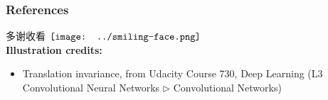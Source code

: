 \documentclass[16pt]{beamer}
\newcommand{\cc}[2]{#1}
\newcommand{\cc}[2]{#2}
\newcommand{\emp}[1]{\textbf{\color{violet}#1}}
\newcommand{\smiley}{$\vcenter{\hbox{\texttt{[image: ../smiling-face.png]}}}$}
\newif\ifframeinlbf
\begin{document}

\frameinlbffalse
\begin{frame}
\frametitle{References}
\cc{多谢收看}{Thanks for watching} \smiley \\
\textbf{Illustration credits:}
\begin{itemize}
	\item Translation invariance, from Udacity Course 730, Deep Learning (L3 Convolutional Neural Networks $\rhd$ Convolutional Networks)
\end{itemize}
\end{frame}
\end{document}
